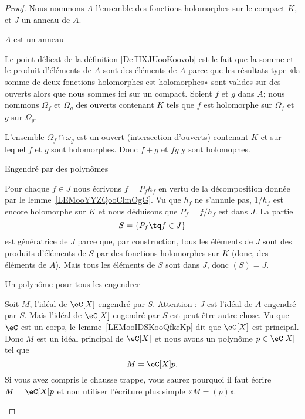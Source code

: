 \begin{proof}
	Nous nommons \( A\) l'ensemble des fonctions holomorphes sur le compact \( K\), et \( J\) un anneau de \( A\).

	\begin{subproof}

		\item[\( A\) est un anneau]

		Le point délicat de la définition \ref{DefHXJUooKoovob} est le fait que la somme et le produit d'éléments de \( A\) sont des éléments de \( A\) parce que les résultats type «la somme de deux fonctions holomorphes est holomorphes» sont valides sur des ouverts alors que nous sommes ici sur un compact. Soient \( f\) et \( g\) dans \( A\); nous nommons \( \Omega_f\) et \( \Omega_g\) des ouverts contenant \( K\) tels que \( f\) est holomorphe sur \( \Omega_f\) et \( g\) sur \( \Omega_g\).

		L'ensemble \( \Omega_f\cap\omega_g\) est un ouvert (intersection d'ouverts) contenant \( K\) et sur lequel \( f\) et \( g\) sont holomorphes. Donc \( f+g\) et \( fg\) y sont holomophes.

		\item[Engendré par des polynômes]

		Pour chaque \( f\in J\) nous écrivons \( f=P_fh_f\) en vertu de la décomposition donnée par le lemme~\ref{LEMooYYZQooClmOgG}. Vu que \( h_f\) ne s'annule pas, \( 1/h_f\) est encore holomorphe sur \( K\) et nous déduisons que \( P_f=f/h_f\) est dans \( J\).  La partie
		\begin{equation}
			S=\{ P_f\tq f\in J \}
		\end{equation}
		est génératrice de \( J\) parce que, par construction, tous les éléments de \( J\) sont des produits d'éléments de \( S\) par des fonctions holomorphes sur \( K\) (donc, des éléments de \( A\)). Mais tous les éléments de \( S\) sont dans \( J\), donc \( (S)=J\).

		\item[Un polynôme pour tous les engendrer]

		Soit \( M\), l'idéal de \( \eC[X]\) engendré par \( S\). Attention : \( J\) est l'idéal de \( A\) engendré par \( S\). Mais l'idéal de \( \eC[X]\) engendré par \( S\) est peut-être autre chose.  Vu que \( \eC\) est un corps, le lemme~\ref{LEMooIDSKooQfkeKp} dit que \( \eC[X]\) est principal. Donc \( M\) est un idéal principal de \( \eC[X]\) et nous avons un polynôme \( p\in \eC[X]\) tel que
		\begin{equation}
			M=\eC[X]p.
		\end{equation}
		Si vous avez compris le chausse trappe, vous saurez pourquoi il faut écrire \( M=\eC[X]p\) et non utiliser l'écriture plus simple «\( M=(p)\)».


\end{subproof}
\end{proof}
